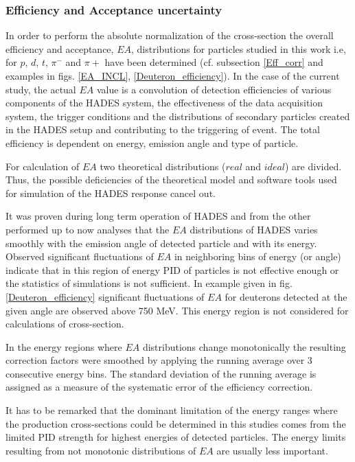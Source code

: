 \subsubsection{Efficiency and Acceptance uncertainty}
\label{eff}

In order to perform the absolute normalization of the cross-section the overall efficiency and acceptance,  $EA$, distributions for  particles studied in this work i.e, for $p$, $d$, $t$, $\pi^-$ and $\pi+$ have been determined (cf. subsection
\ref{Eff_corr} and examples in figs. \ref{EA_INCL}, \ref{Deuteron_efficiency}). In the case of the current study, the actual $EA$ value is a convolution of detection efficiencies of various components of the HADES system, the effectiveness of the data acquisition system, the trigger conditions and the distributions of secondary particles created in the HADES setup and contributing to the triggering of event. The total efficiency is dependent on energy, emission angle and type of particle.

For calculation of $EA$ two theoretical distributions ($real$ and $ideal$) are divided.  
Thus, the possible deficiencies of the theoretical 
model and software tools used for simulation of the HADES response cancel out.

It was proven during long term operation of HADES and from the other performed up to now analyses 
that the $EA$ distributions of HADES varies smoothly with the emission angle of detected particle and with its energy. Observed significant fluctuations of $EA$
in neighboring bins of energy (or angle) indicate that 
in this region of energy PID of particles is not effective enough or the statistics of simulations is not sufficient. In example given in fig. \ref{Deuteron_efficiency} significant fluctuations of $EA$ for deuterons detected at the given angle  
are observed above 750 MeV. This energy region is not considered for calculations of cross-section.

In the energy regions where $EA$ distributions change monotonically the resulting correction factors were smoothed by applying the running 
average over 3 consecutive energy bins.
The standard deviation of the running average is assigned as a measure of the systematic error of the efficiency correction. 

It has to be remarked that the dominant limitation of the energy ranges where the production cross-sections could be determined in this studies comes from the limited PID strength for highest energies of detected particles. The energy limits resulting from not monotonic distributions of $EA$ are usually less important.

